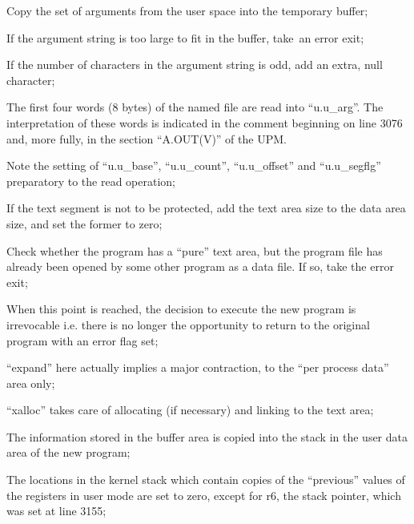 \item[3052:] Copy the set of arguments from
 the user space into the temporary
 buffer;

\item[3064:] If the argument string is too
large to fit in the buffer, take\
an error exit;

\item[3071:] If the number of characters in
the argument string is odd, add
an extra, null character;

\item[3090:] The first four words (8 bytes) of
 the named file are read into
 ``u.u\_arg''. The interpretation of
 these words is indicated in the
 comment beginning on line 3076
 and, more fully, in the section
 ``A.OUT(V)'' of the UPM.

Note the setting of ``u.u\_base'',
``u.u\_count'', ``u.u\_offset'' and
``u.u\_segflg'' preparatory to the
read operation;

\item[3095:] If the text segment is not to be
protected, add the text area size
to the data area size, and set the former to
zero;

\item[3105:] Check whether the program has a
``pure'' text area, but the program
file has already been opened by
some other program as a data
file. If so, take the error exit;

\item[3127:] When this point is reached, the
 decision to execute the new program is irrevocable i.e. there is
 no longer the opportunity to
 return to the original program
 with an error flag set;

\item[3129:] ``expand'' here actually implies a
major contraction, to the ``per
process data'' area only;

\item[3130:] ``xalloc'' takes care of allocating
(if necessary) and linking to the
text area;

\item[3158:] The information stored in the
 buffer area is copied into the
 stack in the user data area of
 the new program;

\item[3186:] The locations in the kernel stack
which contain copies of the ``previous'' values of the registers in
user mode are set to zero, except
for r6, the stack pointer, which
was set at line 3155;

